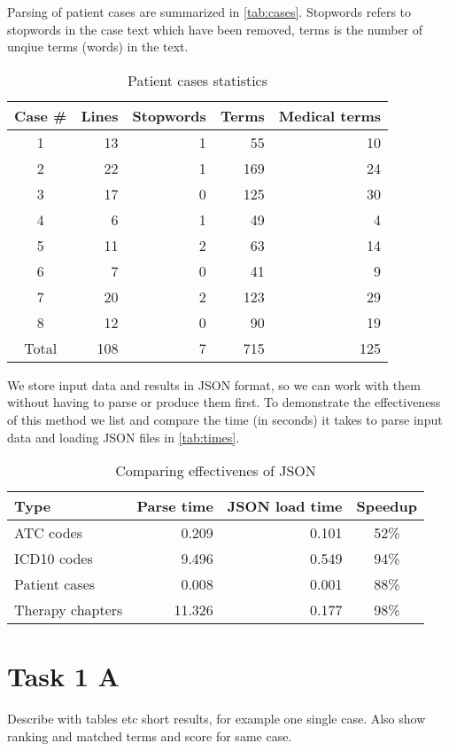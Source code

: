 Parsing of patient cases are summarized in \autoref{tab:cases}. Stopwords
refers to stopwords in the case text which have been removed, terms is the
number of unqiue terms (words) in the text.
\begin{table}[htbp] \footnotesize \center
\caption{Patient cases statistics\label{tab:cases}}
\begin{tabular}{c r r r r}
    \toprule
	Case \# & Lines & Stopwords & Terms & Medical terms \\
    \midrule
	1 & 13 & 1 & 55 & 10 \\
	2 & 22 & 1 & 169 & 24 \\
	3 & 17 & 0 & 125 & 30 \\
	4 & 6 & 1 & 49 & 4 \\
	5 & 11 & 2 & 63 & 14 \\
	6 & 7 & 0 & 41 & 9 \\
	7 & 20 & 2 & 123 & 29 \\
	8 & 12 & 0 & 90 & 19 \\
    \midrule
	Total & 108 & 7 & 715 & 125 \\
	\bottomrule
\end{tabular}
\end{table}

We store input data and results in JSON format, so we can work with them
without having to parse or produce them first. To demonstrate the
effectiveness of this method we list and compare the time (in seconds) it
takes to parse input data and loading JSON files in \autoref{tab:times}.
\begin{table}[htbp] \footnotesize \center
\caption{Comparing effectivenes of JSON\label{tab:times}}
\begin{tabular}{l r r c}
    \toprule
    Type & Parse time & JSON load time & Speedup \\
    \midrule
	ATC codes & 0.209 & 0.101 & 52\% \\
	ICD10 codes & 9.496 & 0.549 & 94\% \\
	Patient cases & 0.008 & 0.001 & 88\% \\
	Therapy chapters & 11.326 & 0.177 & 98\% \\
	\bottomrule
\end{tabular}
\end{table}


\section{Task 1 A}
Describe with tables etc short results, for example one single case.
Also show ranking and matched terms and score for same case.



